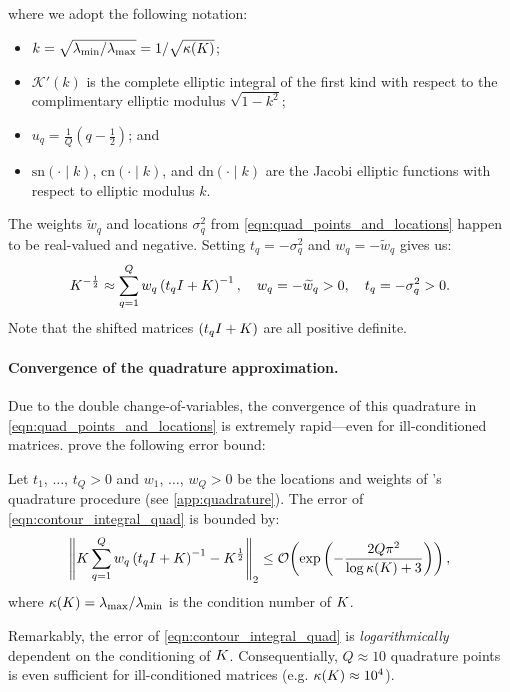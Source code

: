 %
where we adopt the following notation:
\begin{itemize}
  \item $k = \sqrt{ \lambda_\text{min} / \lambda_\text{max} } = 1 / \sqrt{ \kappa(K) }$;
  \item $\mathcal{K}'(k)$ is the complete elliptic integral of the first kind with respect to the complimentary elliptic modulus $\sqrt{1 - k^2}$;
  \item $u_q = \frac{1}{Q}(q - \frac 1 2)$; and
  \item $\text{sn}(\cdot \mid k)$, $\text{cn}(\cdot \mid k )$, and $\text{dn}(\cdot \mid k)$ are the Jacobi elliptic functions with respect to elliptic modulus $k$.
\end{itemize}
%
The weights $\widetilde w_q$ and locations $\sigma_q^2$ from \cref{eqn:quad_points_and_locations} happen to be real-valued and negative.
Setting $t_q = -\sigma_q^2$ and $w_q = -\widetilde w_q$ gives us:
%
\begin{equation}
	K^{-\frac 1 2} \approx \sum_{q=1}^Q w_q \left( t_q I + K \right)^{-1}, \quad w_q = -\widetilde w_q > 0, \quad t_q = -\sigma_q^2 > 0.
  \label{eqn:contour_integral_quad_4}
\end{equation}
%
Note that the shifted matrices $(t_q I + K)$ are all positive definite.

\paragraph{Convergence of the quadrature approximation.}
Due to the double change-of-variables, the convergence of this quadrature in \cref{eqn:quad_points_and_locations} is extremely rapid---even for ill-conditioned matrices.
\citeauthor{hale2008computing} prove the following error bound:
%
\begin{lemma}
  Let $t_1$, $\ldots$, $t_Q > 0$ and $w_1$, $\ldots$, $w_Q > 0$ be the locations and weights of \citeauthor{hale2008computing}'s quadrature procedure (see \cref{app:quadrature}).
  The error of \cref{eqn:contour_integral_quad} is bounded by:
  \[
    \left\Vert \bK \sum_{q=1}^Q w_q \left( t_q \bI + \bK \right)^{-1} - \bK^{\frac 1 2} \right\Vert_2
    \leq \bigo{\exp\left( -\frac  {2 Q \pi^2}{\log \kappa(\bK) + 3} \right)},
  \]
  where $\kappa(K) = \lambda_\text{max} / \lambda_\text{min}$ is the condition number of $K$.
\label{lemma:hale}
\end{lemma}
%
\noindent
Remarkably, the error of \cref{eqn:contour_integral_quad} is \emph{logarithmically} dependent on the conditioning of $K$.
Consequentially, $Q\approx10$ quadrature points is even sufficient for ill-conditioned matrices (e.g. $\kappa(K) \approx 10^4$).

